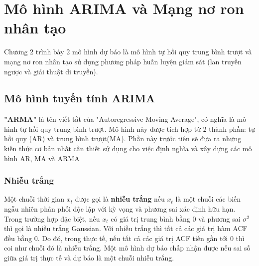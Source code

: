 \chapter{Mô hình ARIMA và Mạng nơ ron nhân tạo}
\ifpdf
    \graphicspath{{2_ARIMA/figures/PNG/}{2_ARIMA/figures/PDF/}{2_ARIMA/figures/}}
\else
    \graphicspath{{2_ARIMA/figures/EPS/}{2_ARIMA/figures/}}
\fi

Chương 2 trình bày 2 mô hình dự báo là mô hình tự hồi quy trung bình trượt và mạng nơ ron nhân tạo sử dụng phương pháp huấn luyện giám sát (lan truyền ngược và giải thuật di truyền).
\section{Mô hình tuyến tính ARIMA}

\textbf{"ARMA"} là tên viết tắt của "Autoregressive Moving Average", có nghĩa là mô hình tự hồi quy-trung bình trượt. Mô hình này được tích hợp từ 2 thành phần: tự hồi quy (AR) và trung bình trượt(MA). Phần này trước tiên sẽ đưa ra những kiến thức cơ bản nhất cần thiết sử dụng cho việc định nghĩa và xây dựng các mô hình AR, MA và ARMA
\subsection{Nhiễu trắng}
Một chuỗi thời gian $x_t$ được gọi là \textbf{nhiễu trắng} nếu $x_t$ là một chuỗi các biến ngẫu nhiên phân phối độc lập với kỳ vọng và phương sai xác định hữu hạn. Trong trường hợp đặc biệt, nếu $x_t$ có giá trị trung bình bằng $0$ và phương sai $\sigma^2$ thì gọi là nhiễu trắng Gaussian. Với nhiễu trắng thì tất cả các giá trị hàm ACF đều bằng $0$. Do đó, trong thực tế, nếu tất cả các giá trị ACF tiến gần tới $0$ thì coi như chuỗi đó là nhiễu trắng. Một mô hình dự báo chấp nhận được nếu sai số giữa giá trị thực tế và dự báo là một chuỗi nhiễu trắng. 


